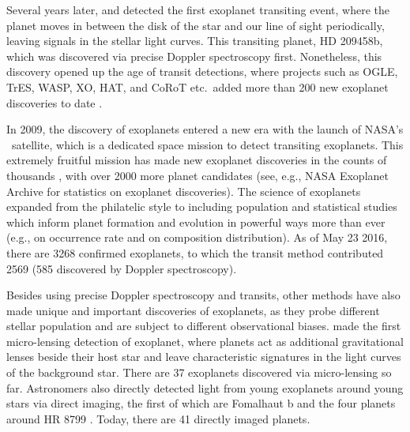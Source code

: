 Several years later, \cite{2000ApJ...529L..41H} and
\cite{2000ApJ...529L..45C} detected the first exoplanet transiting
event, where the planet moves in between the disk of the star and our
line of sight periodically, leaving signals in the stellar light
curves. This transiting planet, HD 209458b, which was discovered via
precise Doppler spectroscopy first. Nonetheless, this discovery opened
up the age of transit detections, where projects such as OGLE, TrES,
WASP, XO, HAT, and CoRoT etc.\ added more than 200 new exoplanet
discoveries to date \citep{2003Natur.421..507K, 2004ApJ...613L.153A,
2006MNRAS.372.1117C, 2006ApJ...648.1228M, 2007ApJ...656..552B}.

In 2009, the discovery of exoplanets entered a new era with the launch
of NASA's \kepler\ satellite, which is a dedicated space mission to
detect transiting exoplanets. This extremely fruitful mission has made
new exoplanet discoveries in the counts of thousands
\citep{2014ApJ...784...45R, 2016ApJ...822...86M}, with over 2000 more
planet candidates (see, e.g., NASA Exoplanet Archive for statistics on
exoplanet discoveries). The science of exoplanets expanded from the
philatelic style to including population and statistical studies which
inform planet formation and evolution in powerful ways more than ever
(e.g., \citealt{2013ApJ...766...81F} on occurrence rate and
\citealt{wolfgang2015b} on composition distribution). As of May
23 2016, there are 3268 confirmed exoplanets, to which the transit
method contributed 2569 (585 discovered by Doppler spectroscopy).

Besides using precise Doppler spectroscopy and transits, other methods
have also made unique and important discoveries of exoplanets, as they
probe different stellar population and are subject to different
observational biases. \cite{2004ApJ...606L.155B} made the first
micro-lensing detection of exoplanet, where planets act as additional
gravitational lenses beside their host star and leave characteristic
signatures in the light curves of the background star. There are 37
exoplanets discovered via micro-lensing so far. Astronomers also
directly detected light from young exoplanets around young stars via
direct imaging, the first of which are Fomalhaut b
\citep{2008Sci...322.1345K} and the four planets around HR 8799
\citep{2008Sci...322.1348M}. Today, there are 41 directly imaged
planets.

